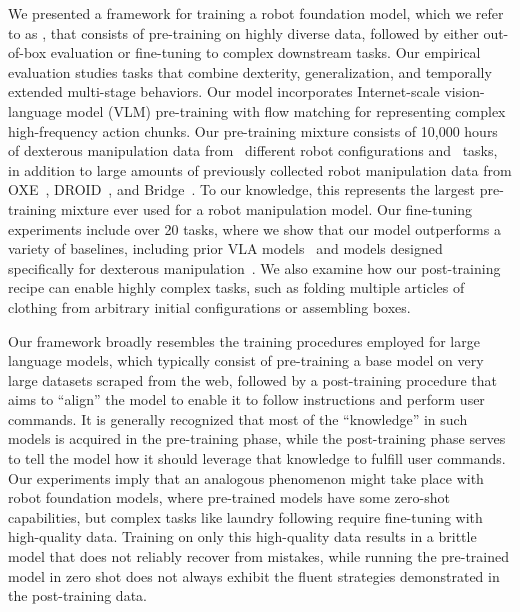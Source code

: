 We presented a framework for training a robot foundation model, which we refer to as \ModelSymbol, that consists of pre-training on highly diverse data, followed by either out-of-box evaluation or fine-tuning to complex downstream tasks. Our empirical evaluation studies tasks that combine dexterity, generalization, and temporally extended multi-stage behaviors. Our model incorporates Internet-scale vision-language model (VLM) pre-training with flow matching for representing complex high-frequency action chunks. Our pre-training mixture consists of 10,000 hours of dexterous manipulation data from \Robots\ different robot configurations and \Tasks\ tasks, in addition to large amounts of previously collected robot manipulation data from OXE~\citep{collaboration2023open}, DROID~\citep{khazatsky2024droid}, and Bridge~\citep{walke2023bridgedata}. To our knowledge, this represents the largest pre-training mixture ever used for a robot manipulation model. Our fine-tuning experiments include over 20 tasks, where we show that our model outperforms a variety of baselines, including prior VLA models~\citep{kim2024openvla} and models designed specifically for dexterous manipulation~\citep{zhao2023learning, chi2023diffusion}. We also examine how our post-training recipe can enable highly complex tasks, such as folding multiple articles of clothing from arbitrary initial configurations or assembling boxes.

Our framework broadly resembles the training procedures employed for large language models, which typically consist of pre-training a base model on very large datasets scraped from the web, followed by a post-training procedure that aims to ``align'' the model to enable it to follow instructions and perform user commands. It is generally recognized that most of the ``knowledge'' in such models is acquired in the pre-training phase, while the post-training phase serves to tell the model how it should leverage that knowledge to fulfill user commands. Our experiments imply that an analogous phenomenon might take place with robot foundation models, where pre-trained models have some zero-shot capabilities, but complex tasks like laundry following require fine-tuning with high-quality data. Training on only this high-quality data results in a brittle model that does not reliably recover from mistakes, while running the pre-trained model in zero shot does not always exhibit the fluent strategies demonstrated in the post-training data.

